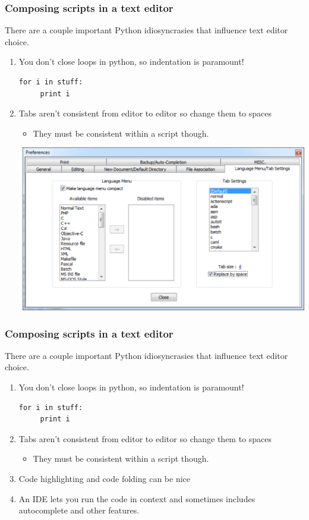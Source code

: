 \documentclass{beamer}
\begin{document}
\begin{frame}[fragile]
\frametitle{Composing scripts in a text editor}
There are a couple important Python idiosyncrasies that influence text editor choice.
\begin{enumerate}
\item You don't close loops in python, so indentation is paramount!
\pause
\begin{lstlisting}
for i in stuff:
     print i
\end{lstlisting}
\pause
\item Tabs aren't consistent from editor to editor so change them to spaces
\begin{itemize}
\item They must be consistent within a script though.
\end{itemize}

\begin{center}\includegraphics[scale=0.35]{figures/tab_setting.pdf}\end{center}


\end{enumerate}
\end{frame}


\begin{frame}[fragile]
\frametitle{Composing scripts in a text editor}
There are a couple important Python idiosyncrasies that influence text editor choice.
\begin{enumerate}
\item You don't close loops in python, so indentation is paramount!
\begin{lstlisting}
for i in stuff:
     print i
\end{lstlisting}
\item Tabs aren't consistent from editor to editor so change them to spaces
\begin{itemize}
\item They must be consistent within a script though.
\end{itemize}
\item Code highlighting and code folding can be nice
\item An IDE lets you run the code in context and sometimes includes autocomplete and other features.

\end{enumerate}
\end{frame}
\end{document}
